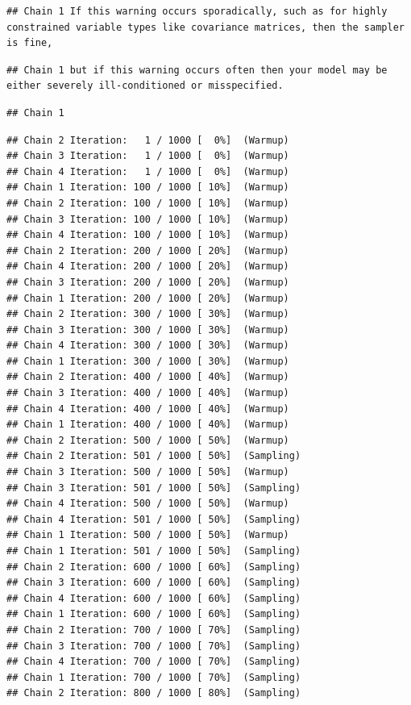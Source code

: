 \documentclass[
]{article}
\begin{document}
\begin{verbatim}
## Chain 1 If this warning occurs sporadically, such as for highly constrained variable types like covariance matrices, then the sampler is fine,
\end{verbatim}

\begin{verbatim}
## Chain 1 but if this warning occurs often then your model may be either severely ill-conditioned or misspecified.
\end{verbatim}

\begin{verbatim}
## Chain 1
\end{verbatim}

\begin{verbatim}
## Chain 2 Iteration:   1 / 1000 [  0%]  (Warmup) 
## Chain 3 Iteration:   1 / 1000 [  0%]  (Warmup) 
## Chain 4 Iteration:   1 / 1000 [  0%]  (Warmup) 
## Chain 1 Iteration: 100 / 1000 [ 10%]  (Warmup) 
## Chain 2 Iteration: 100 / 1000 [ 10%]  (Warmup) 
## Chain 3 Iteration: 100 / 1000 [ 10%]  (Warmup) 
## Chain 4 Iteration: 100 / 1000 [ 10%]  (Warmup) 
## Chain 2 Iteration: 200 / 1000 [ 20%]  (Warmup) 
## Chain 4 Iteration: 200 / 1000 [ 20%]  (Warmup) 
## Chain 3 Iteration: 200 / 1000 [ 20%]  (Warmup) 
## Chain 1 Iteration: 200 / 1000 [ 20%]  (Warmup) 
## Chain 2 Iteration: 300 / 1000 [ 30%]  (Warmup) 
## Chain 3 Iteration: 300 / 1000 [ 30%]  (Warmup) 
## Chain 4 Iteration: 300 / 1000 [ 30%]  (Warmup) 
## Chain 1 Iteration: 300 / 1000 [ 30%]  (Warmup) 
## Chain 2 Iteration: 400 / 1000 [ 40%]  (Warmup) 
## Chain 3 Iteration: 400 / 1000 [ 40%]  (Warmup) 
## Chain 4 Iteration: 400 / 1000 [ 40%]  (Warmup) 
## Chain 1 Iteration: 400 / 1000 [ 40%]  (Warmup) 
## Chain 2 Iteration: 500 / 1000 [ 50%]  (Warmup) 
## Chain 2 Iteration: 501 / 1000 [ 50%]  (Sampling) 
## Chain 3 Iteration: 500 / 1000 [ 50%]  (Warmup) 
## Chain 3 Iteration: 501 / 1000 [ 50%]  (Sampling) 
## Chain 4 Iteration: 500 / 1000 [ 50%]  (Warmup) 
## Chain 4 Iteration: 501 / 1000 [ 50%]  (Sampling) 
## Chain 1 Iteration: 500 / 1000 [ 50%]  (Warmup) 
## Chain 1 Iteration: 501 / 1000 [ 50%]  (Sampling) 
## Chain 2 Iteration: 600 / 1000 [ 60%]  (Sampling) 
## Chain 3 Iteration: 600 / 1000 [ 60%]  (Sampling) 
## Chain 4 Iteration: 600 / 1000 [ 60%]  (Sampling) 
## Chain 1 Iteration: 600 / 1000 [ 60%]  (Sampling) 
## Chain 2 Iteration: 700 / 1000 [ 70%]  (Sampling) 
## Chain 3 Iteration: 700 / 1000 [ 70%]  (Sampling) 
## Chain 4 Iteration: 700 / 1000 [ 70%]  (Sampling) 
## Chain 1 Iteration: 700 / 1000 [ 70%]  (Sampling) 
## Chain 2 Iteration: 800 / 1000 [ 80%]  (Sampling) 

\end{verbatim}
\end{document}
